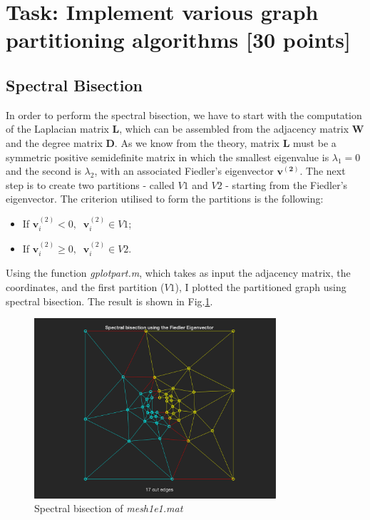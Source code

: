 \documentclass[unicode,11pt,a4paper,oneside,numbers=endperiod,openany]{scrartcl}
\begin{document}
 

\section{Task: Implement various graph partitioning algorithms [30 points]}
\subsection{Spectral Bisection}
In order to perform the spectral bisection, we have to start with the computation of the Laplacian matrix \textbf{L}, which can be assembled from the adjacency matrix \textbf{W} and the degree matrix \textbf{D}. As we know from the theory, matrix \textbf{L} must be a symmetric positive semidefinite matrix in which the smallest eigenvalue is $\lambda_1 = 0$ and the second is $\lambda_2$, with an associated Fiedler's eigenvector $\boldsymbol{\mathbf{v^{(2)}}}$. The next step is to create two partitions - called $V1$ and $V2$ - starting from the Fiedler's eigenvector. The criterion utilised to form the partitions is the following:
\begin{itemize}
	\item If $\boldsymbol{\mathbf{v}}_i^{(2)} < 0, \;\; \boldsymbol{\mathbf{v}}_i^{(2)} \in V1$;
	\item If $\boldsymbol{\mathbf{v}}_i^{(2)} \geq 0, \;\; \boldsymbol{\mathbf{v}}_i^{(2)} \in V2$.
\end{itemize}
Using the function \textit{gplotpart.m}, which takes as input the adjacency matrix, the coordinates, and the first partition ($V1$), I plotted the partitioned graph using spectral bisection. The result is shown in Fig.\ref{fig:spec1e1}.
\begin{figure}[h!]
	\centering
	\includegraphics[width=0.8\textwidth]{images/spectral_mesh1e1.png}
	\caption{Spectral bisection of \textit{mesh1e1.mat}}	
	\label{fig:spec1e1}
\end{figure}
\end{document}

